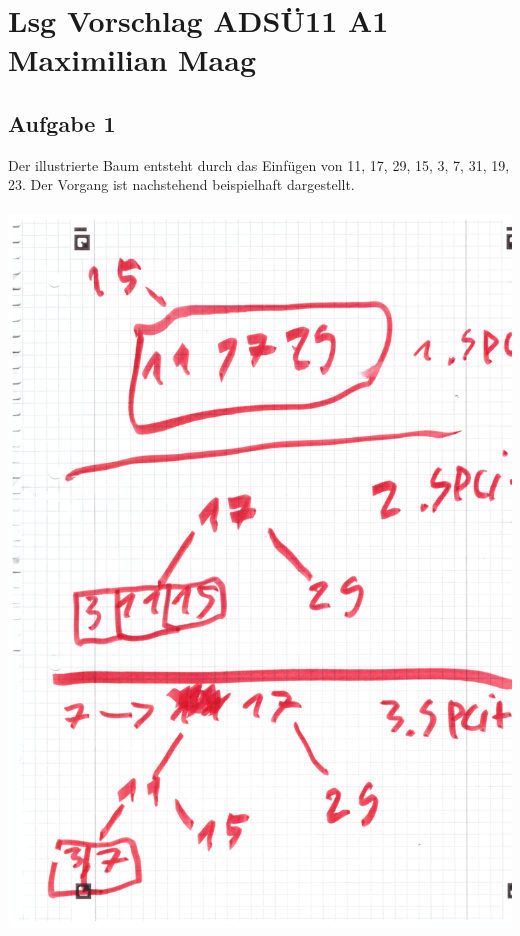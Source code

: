 \documentclass{article}
\begin{document}
	\section*{Lsg Vorschlag ADSÜ11 A1 Maximilian Maag}
	\subsection*{Aufgabe 1}
	Der illustrierte Baum entsteht durch das Einfügen von 11, 17, 29, 15, 3, 7, 31, 19, 23.
	Der Vorgang ist nachstehend beispielhaft dargestellt. \\ \\
	\includegraphics[width=\linewidth]{A10101} \\
\end{document}
